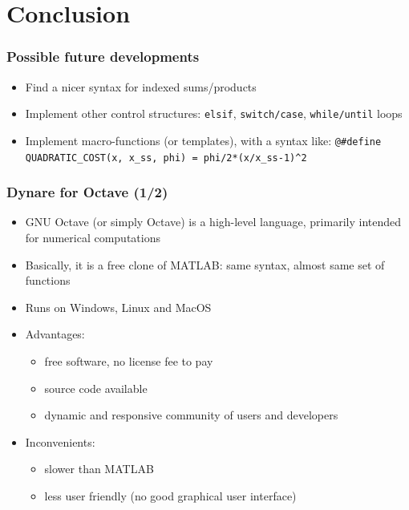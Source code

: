 \documentclass{beamer}
\begin{document}

\section{Conclusion}

\begin{frame}[fragile=singleslide]
  \frametitle{Possible future developments}
  \begin{itemize}
  \item Find a nicer syntax for indexed sums/products
  \item Implement other control structures: \texttt{elsif}, \texttt{switch/case}, \texttt{while/until} loops
  \item Implement macro-functions (or templates), with a syntax like:
    \small
    \verb+@#define QUADRATIC_COST(x, x_ss, phi) = phi/2*(x/x_ss-1)^2+
    \normalsize
  \end{itemize}
\end{frame}

\begin{frame}
  \frametitle{Dynare for Octave (1/2)}
  \begin{itemize}
  \item GNU Octave (or simply Octave) is a high-level language, primarily intended for numerical computations
  \item Basically, it is a free clone of MATLAB: same syntax, almost same set of functions
  \item Runs on Windows, Linux and MacOS
  \item Advantages:
    \begin{itemize}
    \item free software, no license fee to pay
    \item source code available
    \item dynamic and responsive community of users and developers
    \end{itemize}
  \item Inconvenients:
    \begin{itemize}
    \item slower than MATLAB
    \item less user friendly (no good graphical user interface)
    \end{itemize}
  \end{itemize}
\end{frame}
\end{document}
